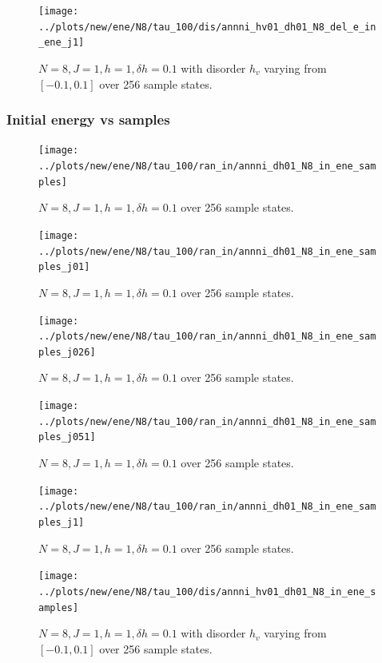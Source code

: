 \documentclass[a4paper]{article}
\begin{document}
\begin{figure}[h!]
  \centering
  \texttt{[image: ../plots/new/ene/N8/tau\_100/dis/annni\_hv01\_dh01\_N8\_del\_e\_in\_ene\_j1]}
  \caption{$N = 8, J = 1, h = 1, \delta h=0.1$ with disorder $h_v$ varying from $[-0.1,0.1]$ over 256 sample states.}
  \label{fig:}
\end{figure}


\clearpage
\subsubsection{Initial energy vs samples}
\begin{figure}[h!]
  \centering
  \texttt{[image: ../plots/new/ene/N8/tau\_100/ran\_in/annni\_dh01\_N8\_in\_ene\_samples]}
  \caption{$N = 8, J = 1, h = 1, \delta h=0.1$ over 256 sample states.}
  \label{fig:}
\end{figure}

\begin{figure}[h!]
  \centering
  \texttt{[image: ../plots/new/ene/N8/tau\_100/ran\_in/annni\_dh01\_N8\_in\_ene\_samples\_j01]}
  \caption{$N = 8, J = 1, h = 1, \delta h=0.1$ over 256 sample states.}
  \label{fig:}
\end{figure}

\begin{figure}[h!]
  \centering
  \texttt{[image: ../plots/new/ene/N8/tau\_100/ran\_in/annni\_dh01\_N8\_in\_ene\_samples\_j026]}
  \caption{$N = 8, J = 1, h = 1, \delta h=0.1$ over 256 sample states.}
  \label{fig:}
\end{figure}

\begin{figure}[h!]
  \centering
  \texttt{[image: ../plots/new/ene/N8/tau\_100/ran\_in/annni\_dh01\_N8\_in\_ene\_samples\_j051]}
  \caption{$N = 8, J = 1, h = 1, \delta h=0.1$ over 256 sample states.}
  \label{fig:}
\end{figure}

\begin{figure}[h!]
  \centering
  \texttt{[image: ../plots/new/ene/N8/tau\_100/ran\_in/annni\_dh01\_N8\_in\_ene\_samples\_j1]}
  \caption{$N = 8, J = 1, h = 1, \delta h=0.1$ over 256 sample states.}
  \label{fig:}
\end{figure}

\begin{figure}[h!]
  \centering
  \texttt{[image: ../plots/new/ene/N8/tau\_100/dis/annni\_hv01\_dh01\_N8\_in\_ene\_samples]}
  \caption{$N = 8, J = 1, h = 1, \delta h=0.1$ with disorder $h_v$ varying from $[-0.1,0.1]$ over 256 sample states.}
  \label{fig:}
\end{figure}
\end{document}
